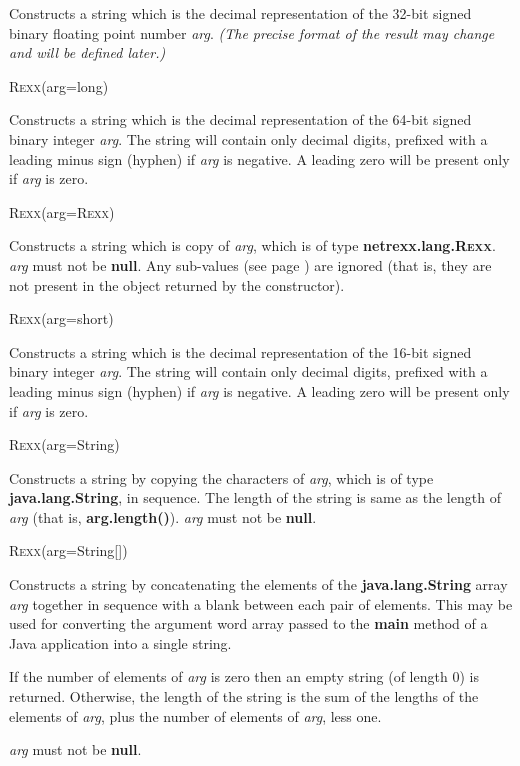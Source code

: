 \begin{description}
Constructs a string which is the decimal representation of
the 32-bit signed binary floating point number \emph{arg}.
 \emph{(The precise format of the result may change and
will be defined later.)}
\item{R\textsc{exx}(arg=long)}

Constructs a string which is the decimal representation of
the 64-bit signed binary integer \emph{arg}.
The string will contain only decimal digits, prefixed with a
leading minus sign (hyphen) if \emph{arg} is negative.
A leading zero will be present only if \emph{arg} is zero.
\item{R\textsc{exx}(arg=R\textsc{exx})}

Constructs a string which is copy of \emph{arg}, which is of
type \textbf{netrexx.lang.R\textsc{exx}}.
\emph{arg} must not be \textbf{null}.
Any  sub-values (see page \pageref{refinstr})  are ignored (that is, they are not present in
the object returned by the constructor).
\item{R\textsc{exx}(arg=short)}

Constructs a string which is the decimal representation of
the 16-bit signed binary integer \emph{arg}.
The string will contain only decimal digits, prefixed with a
leading minus sign (hyphen) if \emph{arg} is negative.
A leading zero will be present only if \emph{arg} is zero.
\item{R\textsc{exx}(arg=String)}

Constructs a \nr{} string by copying the characters of \emph{arg},
which is of type \textbf{java.lang.String}, in sequence.
The length of the string is same as the length of \emph{arg}
(that is, \textbf{arg.length()}).
\emph{arg} must not be \textbf{null}.
\item{R\textsc{exx}(arg=String[])}

Constructs a \nr{} string by concatenating the elements of
the \textbf{java.lang.String} array \emph{arg} together in
sequence with a blank between each pair of elements.
This may be used for converting the argument word array passed to
the \textbf{main} method of a Java application into a single string.
 
If the number of elements of \emph{arg} is zero then an empty string
(of length 0) is returned.  Otherwise, the length of the string is the
sum of the lengths of the elements of \emph{arg}, plus the number of
elements of \emph{arg}, less one.
 
\emph{arg} must not be \textbf{null}.
\end{description}
